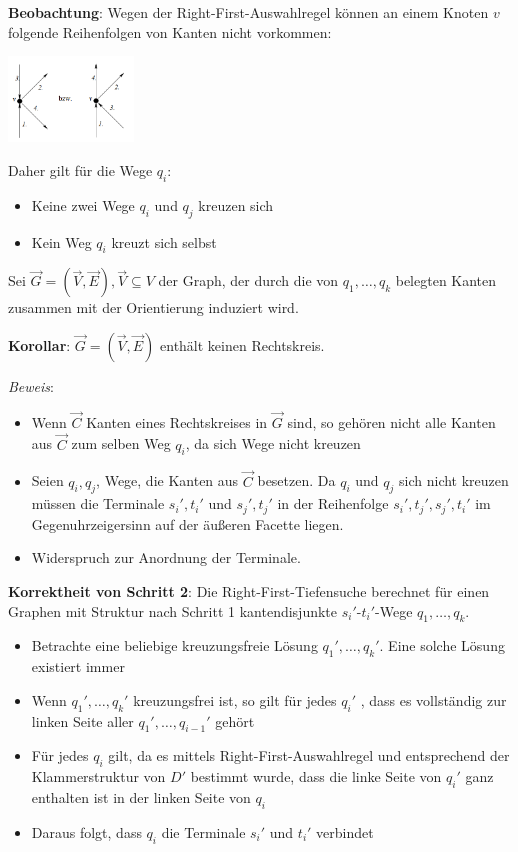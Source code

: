 \textbf{Beobachtung}: Wegen der Right-First-Auswahlregel können an einem Knoten $v$ folgende Reihenfolgen von Kanten nicht vorkommen:
\begin{center}
	\includegraphics[width=0.25\textwidth]{images/s5.png}
\end{center}
Daher gilt für die Wege $q_i$:
\begin{itemize}
	\item Keine zwei Wege $q_i$ und $q_j$ kreuzen sich
	\item Kein Weg $q_i$ kreuzt sich selbst
\end{itemize}

Sei $\overrightarrow{G}=(\overrightarrow{V},\overrightarrow{E}), \overrightarrow{V}\subseteq V$ der Graph, der durch die von $q_1,\ldots,q_k$ belegten Kanten zusammen mit der Orientierung induziert wird.

\textbf{Korollar}: $\overrightarrow{G}=(\overrightarrow{V},\overrightarrow{E})$ enthält keinen Rechtskreis.

\textit{Beweis}:
\begin{itemize}
	\item Wenn $\overrightarrow{C}$ Kanten eines Rechtskreises in $\overrightarrow{G}$ sind, so gehören nicht alle Kanten aus $\overrightarrow{C}$ zum selben Weg $q_i$, da sich Wege nicht kreuzen
	\item Seien $q_i,q_j$, Wege, die Kanten aus $\overrightarrow{C}$ besetzen. Da $q_i$ und $q_j$ sich nicht kreuzen müssen die Terminale $s_i',t_i'$ und $s_j',t_j'$ in der Reihenfolge $s_i',t_j',s_j',t_i'$ im Gegenuhrzeigersinn auf der äußeren Facette liegen.
	\item Widerspruch zur Anordnung der Terminale.
\end{itemize}

\textbf{Korrektheit von Schritt 2}: Die Right-First-Tiefensuche berechnet für einen Graphen mit Struktur nach Schritt 1 kantendisjunkte $s_i'$-$t_i'$-Wege $q_1,\ldots,q_k$.
\begin{itemize}
	\item Betrachte eine beliebige kreuzungsfreie Lösung $q_1',\ldots,q_k'$. Eine solche Lösung existiert immer
	\pagebreak
	
	\item Wenn $q_1',\ldots,q_k'$ kreuzungsfrei ist, so gilt für jedes $q_i'$ , dass es vollständig zur linken Seite aller $q_1',\ldots,q_{i-1}'$ gehört
	\item Für jedes $q_i$ gilt, da es mittels Right-First-Auswahlregel und entsprechend der Klammerstruktur von $D'$ bestimmt wurde, dass die linke Seite von $q_i'$ ganz enthalten ist in der linken Seite von $q_i$
	\item Daraus folgt, dass $q_i$ die Terminale $s_i'$ und $t_i'$ verbindet
\end{itemize}

